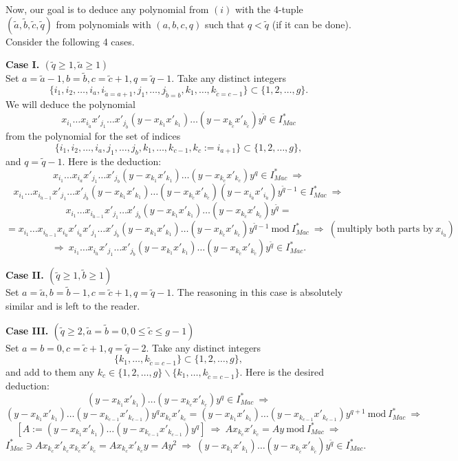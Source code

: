 \documentclass[a4paper,14pt]{article}
\begin{document}
Now, our goal is to deduce any polynomial  from $(i)$ with the 4-tuple $(\tilde{a},\tilde{b},\tilde{c},\tilde{q})$ from polynomials with $(a,b,c,q)$ such that $q<\tilde{q}$ (if it can be done). Consider the following 4 cases.

{\bf Case I. $(\tilde{q}\ge 1, \tilde{a}\ge 1)$}\\
Set $a=\tilde{a}-1, b=\tilde{b}, c=\tilde{c}+1, q=\tilde{q}-1$. Take any distinct integers 
$$
\{ i_1,i_2,\ldots,i_a,i_{\tilde{a}=a+1},j_1,\ldots,j_{\tilde{b}=b}, k_1,\ldots,k_{\tilde{c}=c-1} \}\subset \{1,2,\ldots,g\}.
$$
We will deduce the polynomial 
$$
x_{i_1}\ldots x_{i_{\tilde{a}}}x'_{j_1}\ldots x'_{j_{\tilde{b}}} (y - x_{k_1}x'_{k_1})\ldots  (y - x_{k_{\tilde{c}}}x'_{k_{\tilde{c}}}) y^{\tilde{q}} \in I^*_{Mac}
$$
from the polynomial for the set of indices 
$$
\{ i_1,i_2,\ldots,i_a,j_1,\ldots,j_{b}, k_1,\ldots,k_{c-1}, k_{c}:=i_{a+1} \}\subset \{1,2,\ldots,g\},
$$
and $q=\tilde{q}-1$. Here is the deduction:
$$
x_{i_1}\ldots x_{i_a}x'_{j_1}\ldots x'_{j_b} (y - x_{k_1}x'_{k_1})\ldots  (y - x_{k_c}x'_{k_c}) y^q \in I^*_{Mac}  \  \Rightarrow
$$
$$
x_{i_1}\ldots x_{i_{\tilde{a}-1}}x'_{j_1}\ldots x'_{j_{\tilde{b}}} (y - x_{k_1}x'_{k_1})\ldots  (y - x_{k_{\tilde{c}}}x'_{k_{\tilde{c}}})(y - x_{i_{\tilde{a}}}x'_{i_{\tilde{a}}}) y^{\tilde{q}-1} \in I^*_{Mac} \ \Rightarrow
$$
$$
x_{i_1}\ldots x_{i_{\tilde{a}-1}}x'_{j_1}\ldots x'_{j_{\tilde{b}}} (y - x_{k_1}x'_{k_1})\ldots  (y - x_{k_{\tilde{c}}}x'_{k_{\tilde{c}}})y^{\tilde{q}}     =  
$$
$$
=    x_{i_1}\ldots x_{i_{\tilde{a}-1}} x_{i_{\tilde{a}}}x'_{i_{\tilde{a}}} x'_{j_1}\ldots x'_{j_{\tilde{b}}} (y - x_{k_1}x'_{k_1})\ldots  (y - x_{k_{\tilde{c}}}x'_{k_{\tilde{c}}})y^{\tilde{q}-1} \  \text{mod} \ I^*_{Mac} \ \Rightarrow  \  (\mbox{multiply both parts by} \  x_{i_{\tilde{a}}})  
$$
$$
\Rightarrow \  x_{i_1}\ldots x_{i_{\tilde{a}}}x'_{j_1}\ldots x'_{j_{\tilde{b}}} (y - x_{k_1}x'_{k_1})\ldots  (y - x_{k_{\tilde{c}}}x'_{k_{\tilde{c}}}) y^{\tilde{q}} \in I^*_{Mac}.
$$

{\bf Case II. $(\tilde{q}\ge 1, \tilde{b}\ge 1)$}\\
Set $a=\tilde{a}, b=\tilde{b}-1, c=\tilde{c}+1, q=\tilde{q}-1$. The reasoning in this case is absolutely similar and is left to the reader. 

{\bf Case III. $(\tilde{q}\ge 2, \tilde{a} = \tilde{b} = 0, 0\le \tilde{c}\le g-1)$}\\
Set $a=b=0, c=\tilde{c}+1, q=\tilde{q}-2$. Take any distinct integers 
$$
\{ k_1,\ldots,k_{\tilde{c}=c-1} \}\subset \{1,2,\ldots,g\},
$$
and add to them any $k_c\in \{1,2,\ldots,g\} \backslash   \{ k_1,\ldots,k_{\tilde{c}=c-1} \}$. Here is the desired deduction:
$$
(y - x_{k_1}x'_{k_1})\ldots  (y - x_{k_c}x'_{k_c}) y^q \in I^*_{Mac} \  \Rightarrow
$$
$$
(y - x_{k_1}x'_{k_1})\ldots  (y - x_{k_{c-1}}x'_{k_{c-1}}) y^q x_{k_c}x'_{k_c}= (y - x_{k_1}x'_{k_1})\ldots  (y - x_{k_{c-1}}x'_{k_{c-1}}) y^{q+1}  \ \text{mod} \ I^*_{Mac} \   \Rightarrow
$$
$$
[A:=(y - x_{k_1}x'_{k_1})\ldots  (y - x_{k_{c-1}}x'_{k_{c-1}}) y^q]  \  \Rightarrow \  Ax_{k_c}x'_{k_c} = Ay \ \text{mod} \ I^*_{Mac} \  \Rightarrow 
$$
$$
I^*_{Mac}\ni Ax_{k_c}x'_{k_c}x_{k_c}x'_{k_c} = Ax_{k_c}x'_{k_c}y=Ay^2 \  \Rightarrow  \  (y - x_{k_1}x'_{k_1})\ldots  (y - x_{k_{\tilde{c}}}x'_{k_{\tilde{c}}}) y^{\tilde{q}} \in I^*_{Mac}.
$$
\end{document}
